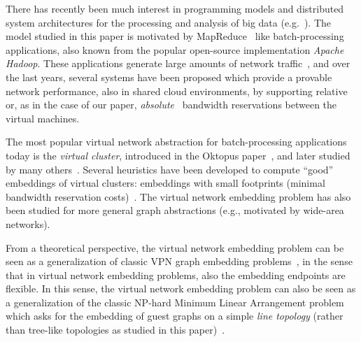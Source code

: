 \documentclass[conference,10pt]{IEEEtran}
\begin{document}
There has recently been much interest in programming models and distributed
system architectures for the processing and analysis of big data (e.g.~\cite{nodb,mapreduce,shark}). The model studied in
this paper is motivated by MapReduce~\cite{mapreduce} like batch-processing applications, also known
from the popular open-source implementation \emph{Apache Hadoop}.
These applications
generate large amounts of network traffic~\cite{orchestra,talk-about,amazonbw},
and over the last years, several systems have been proposed which provide
a provable network performance, also in shared cloud environments, by supporting
relative~\cite{faircloud,elasticswitch,seawall}
or, as in the case of our paper, \emph{absolute}~\cite{oktopus,secondnet,drl,gatekeeper,proteus} bandwidth reservations
between the virtual machines.

The most popular virtual network abstraction for batch-processing applications today is the \emph{virtual cluster},
introduced in the Oktopus paper~\cite{oktopus}, and later studied by many others~\cite{talk-about,ccr15emb,proteus}.
Several heuristics have been developed to compute ``good'' embeddings of virtual clusters: embeddings
with small footprints (minimal bandwidth reservation costs)~\cite{oktopus,talk-about,ccr15emb,proteus}.
The virtual network embedding problem has also been studied for more general graph abstractions
(e.g., motivated by wide-area networks).~\cite{boutaba-survey,fischer-survey}


From a theoretical perspective, the virtual network embedding problem can be seen as a generalization
of classic VPN graph embedding problems~\cite{Goyal2008,gupta2001provisioning},
in the sense that in virtual network embedding problems, also the embedding endpoints are flexible. In this sense, the virtual network embedding problem can also be seen as a generalization of the
classic NP-hard Minimum Linear Arrangement problem which asks for the
embedding of guest graphs on a simple \emph{line topology} (rather than tree-like topologies as
studied in this paper)~\cite{mla,mla-survey}.
\end{document}
